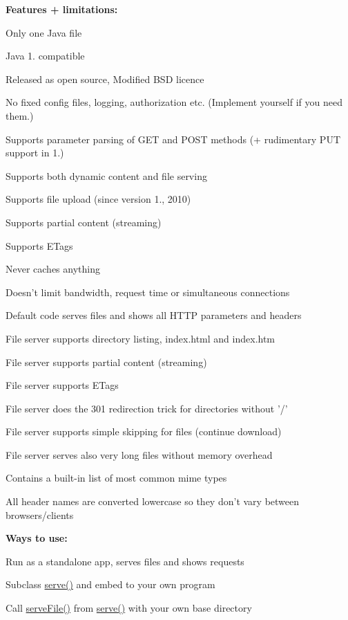 {\bfseries \-Features + limitations\-: }
\begin{DoxyItemize}
\item \-Only one \-Java file  
\item \-Java 1. compatible  
\item \-Released as open source, \-Modified \-B\-S\-D licence  
\item \-No fixed config files, logging, authorization etc. (\-Implement yourself if you need them.)  
\item \-Supports parameter parsing of \-G\-E\-T and \-P\-O\-S\-T methods (+ rudimentary \-P\-U\-T support in 1.)  
\item \-Supports both dynamic content and file serving  
\item \-Supports file upload (since version 1., 2010)  
\item \-Supports partial content (streaming) 
\item \-Supports \-E\-Tags 
\item \-Never caches anything  
\item \-Doesn't limit bandwidth, request time or simultaneous connections  
\item \-Default code serves files and shows all \-H\-T\-T\-P parameters and headers 
\item \-File server supports directory listing, index.\-html and index.\-htm 
\item \-File server supports partial content (streaming) 
\item \-File server supports \-E\-Tags 
\item \-File server does the 301 redirection trick for directories without '/' 
\item \-File server supports simple skipping for files (continue download)  
\item \-File server serves also very long files without memory overhead  
\item \-Contains a built-\/in list of most common mime types  
\item \-All header names are converted lowercase so they don't vary between browsers/clients 


\end{DoxyItemize}

{\bfseries \-Ways to use\-: }
\begin{DoxyItemize}
\item \-Run as a standalone app, serves files and shows requests 
\item \-Subclass \hyperlink{classcom_1_1axcoto_1_1shinjuku_1_1maki_1_1_nano_h_t_t_p_d_a0ef7299275c6b9aae10e13fdbe9df1da}{serve()} and embed to your own program  
\item \-Call \hyperlink{classcom_1_1axcoto_1_1shinjuku_1_1maki_1_1_nano_h_t_t_p_d_a8a8f88d4952bcd30c8793d1151083d47}{serve\-File()} from \hyperlink{classcom_1_1axcoto_1_1shinjuku_1_1maki_1_1_nano_h_t_t_p_d_a0ef7299275c6b9aae10e13fdbe9df1da}{serve()} with your own base directory 


\end{DoxyItemize}

